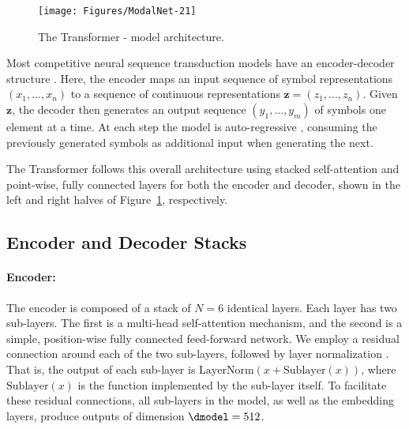 
\begin{figure}
  \centering
  \texttt{[image: Figures/ModalNet-21]}
  \caption{The Transformer - model architecture.}
  \label{fig:model-arch}
\end{figure}


Most competitive neural sequence transduction models have an encoder-decoder structure \citep{cho2014learning,bahdanau2014neural,sutskever14}. Here, the encoder maps an input sequence of symbol representations $(x_1, ..., x_n)$ to a sequence of continuous representations $\mathbf{z} = (z_1, ..., z_n)$. Given $\mathbf{z}$, the decoder then generates an output sequence $(y_1,...,y_m)$ of symbols one element at a time. At each step the model is auto-regressive \citep{graves2013generating}, consuming the previously generated symbols as additional input when generating the next.

The Transformer follows this overall architecture using stacked self-attention and point-wise, fully connected layers for both the encoder and decoder, shown in the left and right halves of Figure~\ref{fig:model-arch}, respectively.

\subsection{Encoder and Decoder Stacks}

\paragraph{Encoder:}The encoder is composed of a stack of $N=6$ identical layers. Each layer has two sub-layers. The first is a multi-head self-attention mechanism, and the second is a simple, position-wise fully connected feed-forward network.   We employ a residual connection \citep{he2016deep} around each of the two sub-layers, followed by layer normalization \cite{layernorm2016}.  That is, the output of each sub-layer is $\mathrm{LayerNorm}(x + \mathrm{Sublayer}(x))$, where $\mathrm{Sublayer}(x)$ is the function implemented by the sub-layer itself.  To facilitate these residual connections, all sub-layers in the model, as well as the embedding layers, produce outputs of dimension $\dmodel=512$.

